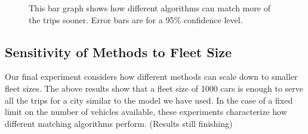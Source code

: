 \documentclass[letterpaper]{article}
\begin{document}
\begin{figure}
\caption{This bar graph shows how different algorithms can match more of the trips sooner. Error bars are for a 95$\%$ confidence level.}
\label{averageWaitTimes}
\end{figure}

\subsection{Sensitivity of Methods to Fleet Size}

Our final experiment considers how different methods can scale down to smaller fleet sizes. The above results show that a fleet size of 1000 cars is enough to serve all the trips for a city similar to the model we have used. In the case of a fixed limit on the number of vehicles available, these experiments characterize how different matching algorithms perform. (Results still finishing)
\end{document}
